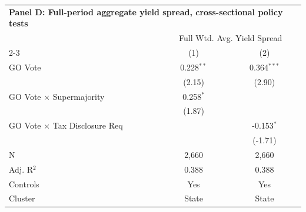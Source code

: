 \begingroup
\centering
\begin{tabular*}{\textwidth}{@{\extracolsep{\fill}}lcc}
\multicolumn{3}{l}{\textbf{Panel D: Full-period aggregate yield spread, cross-sectional policy tests}}\\

\addlinespace
   \toprule
    & \multicolumn{2}{c}{Full Wtd. Avg. Yield Spread}\\
   \cmidrule(lr){2-3}
                                        & (1)          & (2)\\  
   \midrule 
   GO Vote                              & 0.228$^{**}$ & 0.364$^{***}$\\   
                                        & (2.15)      & (2.90)\\   
   GO Vote $\times$ Supermajority       & 0.258$^{*}$  &   \\   
                                        & (1.87)      &   \\   
   GO Vote $\times$ Tax Disclosure Req  &              & -0.153$^{*}$\\   
                                        &              & (-1.71)\\   
   \hline
   N                         & 2,660        & 2,660\\  
   Adj. R$^2$                       & 0.388        & 0.388\\  
   Controls                   & Yes            & Yes\\
   Cluster              & State & State\\  
   \bottomrule
\end{tabular*}
\par\endgroup
